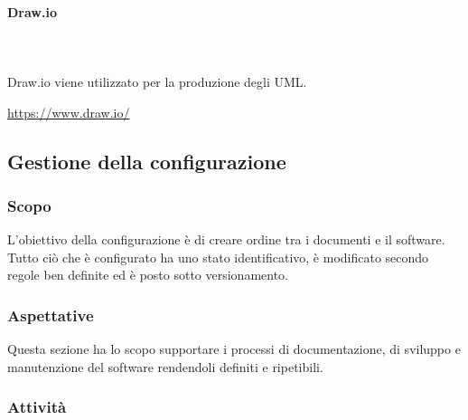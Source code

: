 \paragraph{Draw.io}\mbox{} \\ \mbox{} \\
Draw.io viene utilizzato per la produzione degli UML.\\
\centerline{\url{https://www.draw.io/}} 

\subsection{Gestione della configurazione}
\subsubsection{Scopo}
L'obiettivo della configurazione è di creare ordine tra i documenti e il software. Tutto ciò che è configurato ha uno stato identificativo, è modificato secondo regole ben definite ed è posto sotto versionamento\glo.

\subsubsection{Aspettative}
Questa sezione ha lo scopo supportare i processi di documentazione, di sviluppo e manutenzione del software rendendoli definiti e ripetibili.
\subsubsection{Attività}

